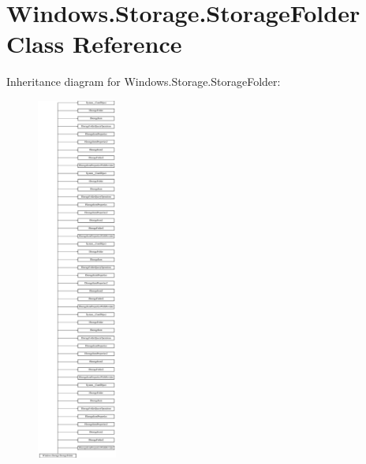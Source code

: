 \hypertarget{class_windows_1_1_storage_1_1_storage_folder}{}\section{Windows.\+Storage.\+Storage\+Folder Class Reference}
\label{class_windows_1_1_storage_1_1_storage_folder}
Inheritance diagram for Windows.\+Storage.\+Storage\+Folder\+:\begin{figure}[H]
\begin{center}
\leavevmode
\includegraphics[height=12.000000cm]{class_windows_1_1_storage_1_1_storage_folder}
\end{center}
\end{figure}
